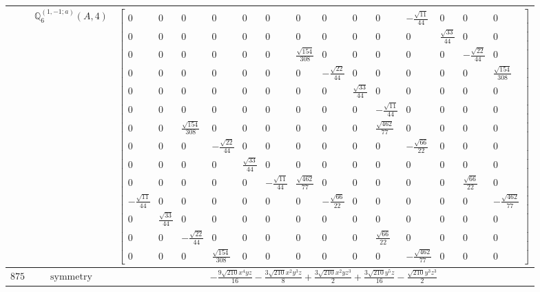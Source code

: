 \documentclass[fleqn,8pt,landscape]{jsarticle}
\begin{document}
\begin{longtable}{ccc}
$  $ & $ \mathbb{Q}_{6}^{(1,-1;a)}(A,4) $ & $ \begin{bmatrix} 0 & 0 & 0 & 0 & 0 & 0 & 0 & 0 & 0 & 0 & - \frac{\sqrt{11}}{44} & 0 & 0 & 0 \\ 0 & 0 & 0 & 0 & 0 & 0 & 0 & 0 & 0 & 0 & 0 & \frac{\sqrt{33}}{44} & 0 & 0 \\ 0 & 0 & 0 & 0 & 0 & 0 & \frac{\sqrt{154}}{308} & 0 & 0 & 0 & 0 & 0 & - \frac{\sqrt{22}}{44} & 0 \\ 0 & 0 & 0 & 0 & 0 & 0 & 0 & - \frac{\sqrt{22}}{44} & 0 & 0 & 0 & 0 & 0 & \frac{\sqrt{154}}{308} \\ 0 & 0 & 0 & 0 & 0 & 0 & 0 & 0 & \frac{\sqrt{33}}{44} & 0 & 0 & 0 & 0 & 0 \\ 0 & 0 & 0 & 0 & 0 & 0 & 0 & 0 & 0 & - \frac{\sqrt{11}}{44} & 0 & 0 & 0 & 0 \\ 0 & 0 & \frac{\sqrt{154}}{308} & 0 & 0 & 0 & 0 & 0 & 0 & \frac{\sqrt{462}}{77} & 0 & 0 & 0 & 0 \\ 0 & 0 & 0 & - \frac{\sqrt{22}}{44} & 0 & 0 & 0 & 0 & 0 & 0 & - \frac{\sqrt{66}}{22} & 0 & 0 & 0 \\ 0 & 0 & 0 & 0 & \frac{\sqrt{33}}{44} & 0 & 0 & 0 & 0 & 0 & 0 & 0 & 0 & 0 \\ 0 & 0 & 0 & 0 & 0 & - \frac{\sqrt{11}}{44} & \frac{\sqrt{462}}{77} & 0 & 0 & 0 & 0 & 0 & \frac{\sqrt{66}}{22} & 0 \\ - \frac{\sqrt{11}}{44} & 0 & 0 & 0 & 0 & 0 & 0 & - \frac{\sqrt{66}}{22} & 0 & 0 & 0 & 0 & 0 & - \frac{\sqrt{462}}{77} \\ 0 & \frac{\sqrt{33}}{44} & 0 & 0 & 0 & 0 & 0 & 0 & 0 & 0 & 0 & 0 & 0 & 0 \\ 0 & 0 & - \frac{\sqrt{22}}{44} & 0 & 0 & 0 & 0 & 0 & 0 & \frac{\sqrt{66}}{22} & 0 & 0 & 0 & 0 \\ 0 & 0 & 0 & \frac{\sqrt{154}}{308} & 0 & 0 & 0 & 0 & 0 & 0 & - \frac{\sqrt{462}}{77} & 0 & 0 & 0 \end{bmatrix} $ \\ \hline
$ 875 $ & $ \text{symmetry} $ & $ - \frac{9 \sqrt{210} x^{4} y z}{16} - \frac{3 \sqrt{210} x^{2} y^{3} z}{8} + \frac{3 \sqrt{210} x^{2} y z^{3}}{2} + \frac{3 \sqrt{210} y^{5} z}{16} - \frac{\sqrt{210} y^{3} z^{3}}{2} $ \\

\end{longtable}
\end{document}
